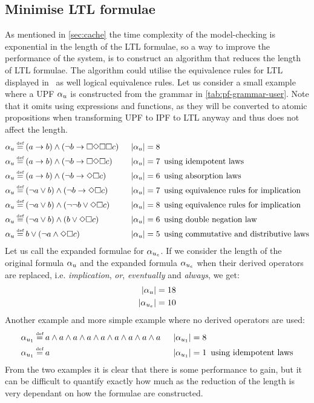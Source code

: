 \subsection{Minimise LTL formulae}\label{sec:min-ltl}
As mentioned in \autoref{sec:cache} the time complexity of the model-checking is exponential in the length of the LTL formulae, so a way to improve the performance of the system, is to construct an algorithm that reduces the length of LTL formulae. The algorithm could utilise the equivalence rules for LTL displayed in~\cite[Fig.~5.7]{baier2008principles} as well logical equivalence rules. Let us consider a small example where a UPF $\alpha_u$ is constructed from the grammar in \autoref{tab:pf-grammar-user}. Note that it omits using expressions and functions, as they will be converted to atomic propositions when transforming UPF to IPF to LTL anyway and thus does not affect the length.
\begin{align*}
    \pf_u &\eqdef (a \imply b) \land (\lnot b \imply \G\F\G\G c)     \enskip &|\upf| = 8 & \\
    \pf_u &\eqdef (a \imply b) \land (\lnot b \imply \G\F\G c)       \enskip &|\upf| = 7 &\enskip \text{using idempotent laws} \\
    \pf_u &\eqdef (a \imply b) \land (\lnot b \imply \F\G c)         \enskip &|\upf| = 6 &\enskip \text{using absorption laws} \\
    \pf_u &\eqdef (\lnot a \lor b) \land (\lnot b \imply \F\G c)     \enskip &|\upf| = 7 &\enskip \text{using equivalence rules for implication} \\
    \pf_u &\eqdef (\lnot a \lor b) \land (\lnot \lnot b \lor \F\G c) \enskip &|\upf| = 8 &\enskip \text{using equivalence rules for implication} \\
    \pf_u &\eqdef (\lnot a \lor b) \land (b \lor \F\G c)             \enskip &|\upf| = 6 &\enskip \text{using double negation law} \\
    \pf_u &\eqdef b \lor (\lnot a \land \F\G c)                      \enskip &|\upf| = 5 &\enskip \text{using commutative and distributive laws}
\end{align*}
Let us call the expanded formulae for $\alpha_{u_e}$. If we consider the length of the original formula $\alpha_u$ and the expanded formula $\alpha_{u_e}$ when their derived operators are replaced, i.e. \emph{implication}, \emph{or}, \emph{eventually} and \emph{always}, we get:
\begin{align}
    |\alpha_u| = 18 \\
    |\alpha_{u_e}| = 10
\end{align}
Another example and more simple example where no derived operators are used:
\begin{align*}
    \pf_{u_1} &\eqdef a \land a \land a \land a \land a \land a \land a \land a \land a \enskip &|\pf_{u_1}| = 8 & \\
    \pf_{u_1} &\eqdef a                                                                 \enskip &|\pf_{u_1}| = 1 &\enskip \text{using idempotent laws}
\end{align*}
From the two examples it is clear that there is some performance to gain, but it can be difficult to quantify exactly how much as the reduction of the length is very dependant on how the formulae are constructed.